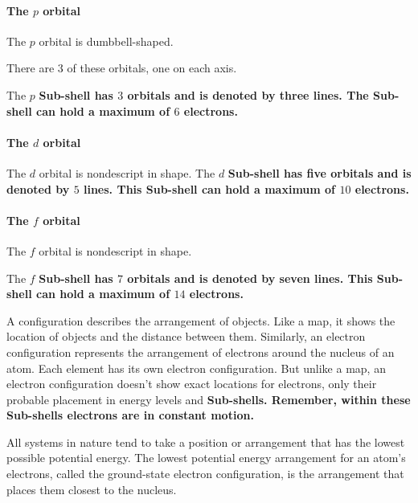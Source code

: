 \paragraph{The $p$ orbital} The $p$ orbital is dumbbell-shaped.

There are $3$ of these orbitals, one on each axis.

The $p$ \bf{Sub-shell} has $3$ orbitals and is denoted by three lines. The \bf{Sub-shell}
can hold a maximum of $6$ electrons.

\paragraph{The $d$ orbital} The $d$ orbital is nondescript in shape. The $d$ \bf{Sub-shell} has five orbitals and
is denoted by $5$ lines. This \bf{Sub-shell} can hold a maximum of $10$ electrons.

\paragraph{The $f$ orbital} The $f$ orbital is nondescript in shape.

The $f$ \bf{Sub-shell} has $7$ orbitals and is denoted by seven lines. This \bf{Sub-shell}
can hold a maximum of $14$ electrons.

A configuration describes the arrangement of objects. Like a map, it shows the
location of objects and the distance between them. Similarly, an electron
configuration represents the arrangement of electrons around the nucleus of an
atom. Each element has its own electron configuration. But unlike a map, an
electron configuration doesn't show exact locations for electrons, only their
probable placement in energy levels and \bf{Sub-shells}. Remember, within these
\bf{Sub-shells} electrons are in constant motion.

All systems in nature tend to take a position or arrangement that has the lowest
possible potential energy. The lowest potential energy arrangement for an atom's
electrons, called the ground-state electron configuration, is the arrangement
that places them closest to the nucleus.

\newpage
